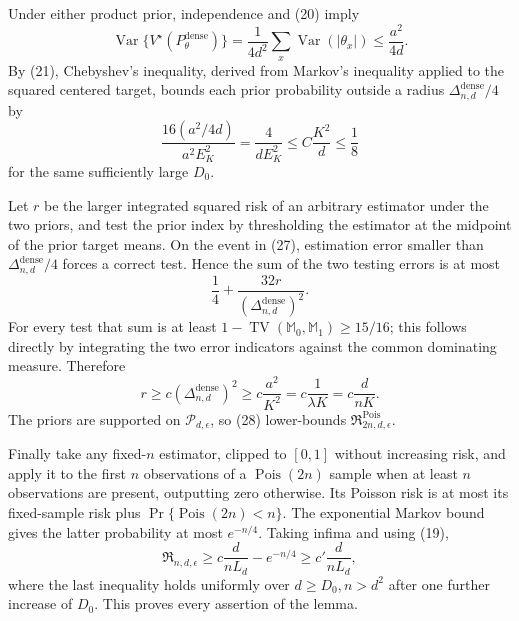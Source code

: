 Under either product prior, independence and (20) imply
\[
 \operatorname{Var}\{V^\star(P_\theta^{\mathrm{dense}})\}
 =\frac1{4d^2}\sum_x\operatorname{Var}(|\theta_x|)
 \leq\frac{a^2}{4d}.                                                   \tag{26}
\]
By (21), Chebyshev's inequality, derived from Markov's inequality applied to the squared centered target, bounds each prior probability outside a radius \(\Delta_{n,d}^{\mathrm{dense}}/4\) by
\[
 \frac{16(a^2/4d)}{a^2E_K^2}=\frac4{dE_K^2}\leq C\frac{K^2}{d}\leq\frac18 \tag{27}
\]
for the same sufficiently large \(D_0\).

Let \(r\) be the larger integrated squared risk of an arbitrary estimator under the two priors, and test the prior index by thresholding the estimator at the midpoint of the prior target means.  On the event in (27), estimation error smaller than \(\Delta_{n,d}^{\mathrm{dense}}/4\) forces a correct test.  Hence the sum of the two testing errors is at most
\[
 \frac14+\frac{32r}{(\Delta_{n,d}^{\mathrm{dense}})^2}.
\]
For every test that sum is at least \(1-\operatorname{TV}(\mathbb M_0,\mathbb M_1)\geq15/16\); this follows directly by integrating the two error indicators against the common dominating measure.  Therefore
\[
 r\geq c(\Delta_{n,d}^{\mathrm{dense}})^2
 \geq c\frac{a^2}{K^2}=c\frac1{\lambda K}=c\frac d{nK}.             \tag{28}
\]
The priors are supported on \(\mathcal P_{d,\epsilon}\), so (28) lower-bounds \(\mathfrak R^{\mathrm{Pois}}_{2n,d,\epsilon}\).

Finally take any fixed-\(n\) estimator, clipped to \([0,1]\) without increasing risk, and apply it to the first \(n\) observations of a \(\operatorname{Pois}(2n)\) sample when at least \(n\) observations are present, outputting zero otherwise.  Its Poisson risk is at most its fixed-sample risk plus \(\Pr\{\operatorname{Pois}(2n)<n\}\).  The exponential Markov bound gives the latter probability at most \(e^{-n/4}\).  Taking infima and using (19),
\[
 \mathfrak R_{n,d,\epsilon}
 \geq c\frac d{nL_d}-e^{-n/4}
 \geq c'\frac d{nL_d},                                                \tag{29}
\]
where the last inequality holds uniformly over \(d\geq D_0,n>d^2\) after one further increase of \(D_0\).  This proves every assertion of the lemma.